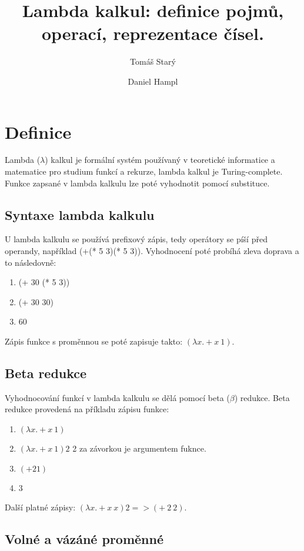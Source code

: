 \documentclass{szzclass}
\title{Lambda kalkul: definice pojmů, operací, reprezentace čísel.}
\author{
    Tomáš Starý
    \and
    Daniel Hampl
}
\begin{document}
\maketitle

\tableofcontents
\newpage

\section{Definice}

Lambda ($\lambda$) kalkul je formální systém používaný v teoretické informatice a matematice pro studium funkcí a rekurze, lambda kalkul je Turing-complete.
Funkce zapsané v lambda kalkulu lze poté vyhodnotit pomocí substituce.

\subsection{Syntaxe lambda kalkulu}

U lambda kalkulu se používá prefixový zápis, tedy operátory se píší před operandy, například (+(* 5 3)(* 5 3)).
Vyhodnocení poté probíhá zleva doprava a to následovně:
\begin{enumerate}
    \item (+ 30 (* 5 3))
    \item (+ 30 30)
    \item 60
\end{enumerate}

Zápis funkce s proměnnou se poté zapisuje takto: $(\lambda x. + x\ 1)$.

\subsection{Beta redukce}

Vyhodnocování funkcí v lambda kalkulu se dělá pomocí beta ($\beta$) redukce.
Beta redukce provedená na příkladu zápisu funkce:
\begin{enumerate}
    \item $(\lambda x. + x\ 1)$
    \item $(\lambda x. + x\ 1)2$
          2 za závorkou je argumentem fuknce.
    \item $(+ 2 1)$
    \item 3
\end{enumerate}

Další platné zápisy: $(\lambda x. + x\ x) 2 => (+\ 2\ 2)$.

\subsection{Volné a vázáné proměnné}
\end{document}
